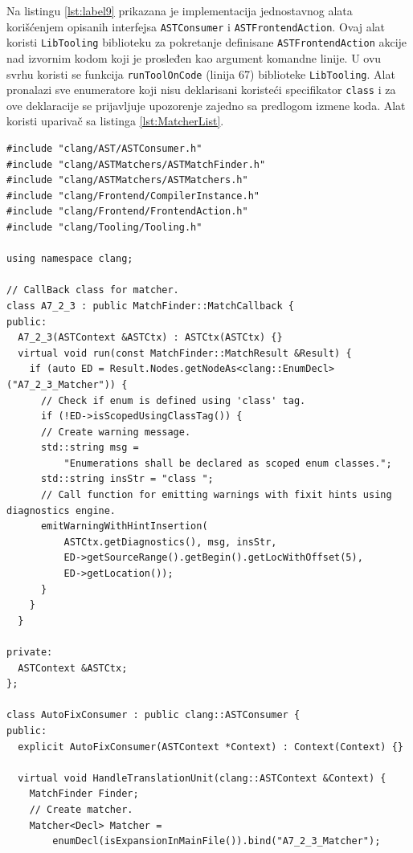 \documentclass[12pt,oneside]{memoir}
\begin{document}
Na listingu \ref{lst:label9} prikazana je implementacija jednostavnog alata kori\v{s}\'{c}enjem opisanih interfejsa \texttt{ASTConsumer} i \texttt{ASTFrontendAction}. Ovaj alat koristi \texttt{LibTooling} biblioteku za pokretanje definisane \texttt{ASTFrontendAction} akcije nad izvornim kodom koji je prosleđen kao argument komandne linije. U ovu svrhu koristi se funkcija \texttt{runToolOnCode} (linija 67) biblioteke \texttt{LibTooling}. Alat pronalazi sve enumeratore koji nisu deklarisani koriste\'{c}i specifikator \texttt{class} i za ove deklaracije se prijavljuje upozorenje zajedno sa predlogom izmene koda. Alat koristi upariva\v{c} sa listinga \ref{lst:MatcherList}.
\\
\begin{lstlisting}[style=customc,  caption={Primer implementacije jednostavnog alata upotrebom interfejsa \texttt{ASTConsumer}, \texttt{ASTFrontendAction} i bibliotekom \texttt{libtooling}.}, label=lst:label9]
#include "clang/AST/ASTConsumer.h"
#include "clang/ASTMatchers/ASTMatchFinder.h"
#include "clang/ASTMatchers/ASTMatchers.h"
#include "clang/Frontend/CompilerInstance.h"
#include "clang/Frontend/FrontendAction.h"
#include "clang/Tooling/Tooling.h"

using namespace clang;

// CallBack class for matcher.
class A7_2_3 : public MatchFinder::MatchCallback {
public:
  A7_2_3(ASTContext &ASTCtx) : ASTCtx(ASTCtx) {}
  virtual void run(const MatchFinder::MatchResult &Result) {
    if (auto ED = Result.Nodes.getNodeAs<clang::EnumDecl>("A7_2_3_Matcher")) {
      // Check if enum is defined using 'class' tag.
      if (!ED->isScopedUsingClassTag()) {
      // Create warning message.
      std::string msg =
          "Enumerations shall be declared as scoped enum classes.";
      std::string insStr = "class ";
      // Call function for emitting warnings with fixit hints using diagnostics engine.
      emitWarningWithHintInsertion(
          ASTCtx.getDiagnostics(), msg, insStr,
          ED->getSourceRange().getBegin().getLocWithOffset(5),
          ED->getLocation());
      }
    }
  }

private:
  ASTContext &ASTCtx;
};

class AutoFixConsumer : public clang::ASTConsumer {
public:
  explicit AutoFixConsumer(ASTContext *Context) : Context(Context) {}

  virtual void HandleTranslationUnit(clang::ASTContext &Context) {
    MatchFinder Finder;
    // Create matcher.
    Matcher<Decl> Matcher =
        enumDecl(isExpansionInMainFile()).bind("A7_2_3_Matcher");


\end{lstlisting}
\end{document}
